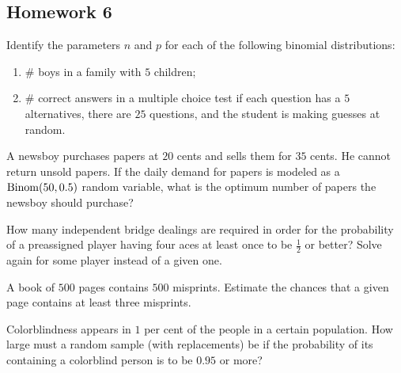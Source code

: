 \subsection{Homework 6}
\begin{problem}[Handout 8, \# 2]
  Identify the parameters \(n\) and \(p\) for each of the following
  binomial distributions:
  \begin{enumerate}[label=(\alph*),noitemsep]
  \item \(\#\) boys in a family with \(5\) children;
  \item \(\#\) correct answers in a multiple choice test if each
    question has a \(5\) alternatives, there are \(25\) questions, and the
    student is making guesses at random.
  \end{enumerate}
\end{problem}
\begin{solution}
\end{solution}

\begin{problem}[Handout 8, \# 10]
  A newsboy purchases papers at \(20\) cents and sells them for \(35\)
  cents. He cannot return unsold papers. If the daily demand for papers is
  modeled as a \(\operatorname{Binom}(50,0.5)\) random variable, what is the optimum
  number of papers the newsboy should purchase?
\end{problem}
\begin{solution}
\end{solution}

\begin{problem}[Handout 8, \# 12]
  How many independent bridge dealings are required in order for the
  probability of a preassigned player having four aces at least once to be
  \(\frac{1}{2}\) or better? Solve again for some player instead of a given
  one.
\end{problem}
\begin{solution}
\end{solution}

\begin{problem}[Handout 8, \# 13]
  A book of \(500\) pages contains \(500\) misprints. Estimate the chances
  that a given page contains at least three misprints.
\end{problem}
\begin{solution}
\end{solution}


\begin{problem}[Handout 8, \# 14]
  Colorblindness appears in \(1\) per cent of the people in a certain
  population. How large must a random sample (with replacements) be if the
  probability of its containing a colorblind person is to be \(0.95\) or more?
\end{problem}
\begin{solution}
\end{solution}

